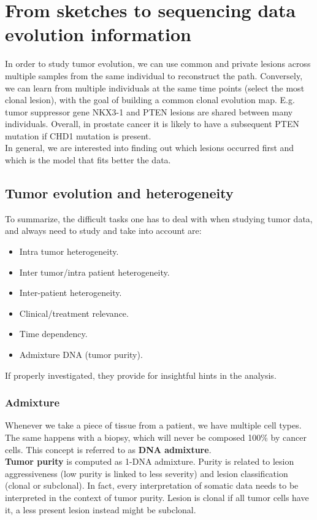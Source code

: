 \section{From sketches to sequencing data evolution information}
In order to study tumor evolution, we can use common and private lesions across multiple samples from the same individual to reconstruct the path.
Conversely, we can learn from multiple individuals at the same time points (select the most clonal lesion), with the goal of building a common clonal evolution map.
E.g. tumor suppressor gene NKX3-1 and PTEN lesions are shared between many individuals. Overall, in prostate cancer it is likely to have a subsequent PTEN mutation if CHD1 mutation is present.
\\
In general, we are interested into finding out which lesions occurred first and which is the model that fits better the data.

\subsection{Tumor evolution and heterogeneity}
To summarize, the difficult tasks one has to deal with when studying tumor data, and always need to study and take into account are:
\begin{multicols}{2}
\begin{itemize}
\item Intra tumor heterogeneity.
\item Inter tumor/intra patient heterogeneity.
\item Inter-patient heterogeneity.
\item Clinical/treatment relevance.
\item Time dependency.
\item Admixture DNA (tumor purity).
\end{itemize}
\end{multicols}

If properly investigated, they provide for insightful hints in the analysis.

\subsubsection{Admixture}
Whenever we take a piece of tissue from a patient, we have multiple cell types. The same happens with a biopsy, which will never be composed 100\% by cancer cells. This concept is referred to as \textbf{DNA admixture}.
\\
\textbf{Tumor purity} is computed as 1-DNA admixture. Purity is related to lesion aggressiveness (low purity is linked to less severity) and lesion classification (clonal or subclonal). In fact, every interpretation of somatic data needs to be interpreted in the context of tumor purity. Lesion is clonal if all tumor cells have it, a less present lesion instead might be subclonal.

